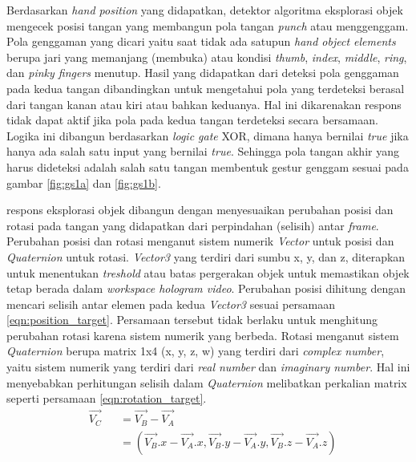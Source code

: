 			Berdasarkan \textit{hand position} yang didapatkan, detektor algoritma eksplorasi objek mengecek posisi tangan yang membangun pola tangan \textit{punch} atau menggenggam. Pola genggaman yang dicari yaitu saat tidak ada satupun \textit{hand object elements} berupa jari yang memanjang (membuka) atau kondisi \textit{thumb}, \textit{index}, \textit{middle}, \textit{ring}, dan \textit{pinky fingers} menutup. Hasil yang didapatkan dari deteksi pola genggaman pada kedua tangan dibandingkan untuk mengetahui pola yang terdeteksi berasal dari tangan kanan atau kiri atau bahkan keduanya. Hal ini dikarenakan respons tidak dapat aktif jika pola pada kedua tangan terdeteksi secara bersamaan. Logika ini dibangun berdasarkan \textit{logic gate} XOR, dimana hanya bernilai \textit{true} jika hanya ada salah satu input yang bernilai \textit{true}. Sehingga pola tangan akhir yang harus dideteksi adalah salah satu tangan membentuk gestur genggam sesuai pada gambar \ref{fig:gs1a} dan \ref{fig:gs1b}.
			
			respons eksplorasi objek dibangun dengan menyesuaikan perubahan posisi dan rotasi pada tangan yang didapatkan dari perpindahan (selisih) antar \textit{frame}. Perubahan posisi dan rotasi menganut sistem numerik \textit{Vector} untuk posisi dan \textit{Quaternion} untuk rotasi. \textit{Vector3} yang terdiri dari sumbu x, y, dan z, diterapkan untuk menentukan \textit{treshold} atau batas pergerakan objek untuk memastikan objek tetap berada dalam \textit{workspace hologram video}. Perubahan posisi dihitung dengan mencari selisih antar elemen pada kedua \textit{Vector3} sesuai persamaan \ref{eqn:position_target}. Persamaan tersebut tidak berlaku untuk menghitung perubahan rotasi karena sistem numerik yang berbeda. Rotasi menganut sistem \textit{Quaternion} berupa matrix 1x4 (x, y, z, w) yang terdiri dari \textit{complex number}, yaitu sistem numerik yang terdiri dari \textit{real number} dan \textit{imaginary number}. Hal ini menyebabkan perhitungan selisih dalam \textit{Quaternion} melibatkan perkalian matrix seperti persamaan \ref{eqn:rotation_target}.
			\begin{equation}
				\begin{alignedat}{2}
					& \overrightarrow{V_{C}} &&= \overrightarrow{V_{B}} - \overrightarrow{V_{A}}\\
					& 		&&= (\overrightarrow{V_{B}}.x - \overrightarrow{V_{A}}.x, \overrightarrow{V_{B}}.y - \overrightarrow{V_{A}}.y, \overrightarrow{V_{B}}.z - \overrightarrow{V_{A}}.z)\\
				\end{alignedat}
				\label{eqn:position_target}
			\end{equation}
			
